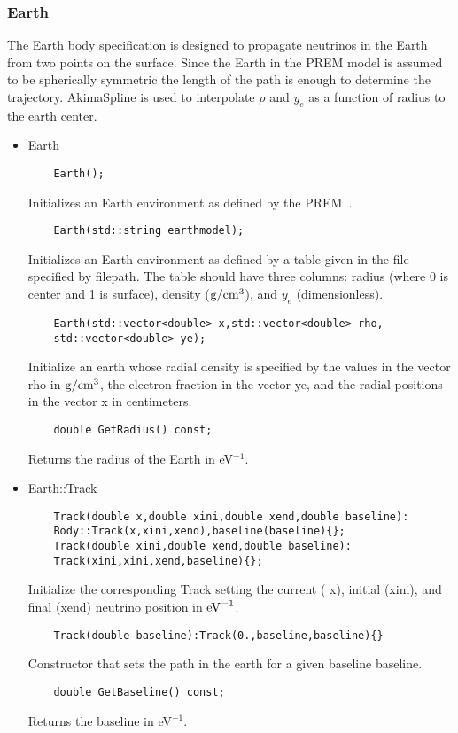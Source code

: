 \documentclass[3p,12pt]{elsarticle}
\newcommand{\ttf}{\ttfamily}
\begin{document}
\subsubsection{Earth \label{sec:earth}}
The {\ttf Earth} body specification is designed to propagate neutrinos
in the Earth from two points on the surface. Since the Earth in the
PREM model is assumed to be spherically symmetric the length of the
path is enough to determine the trajectory. {\ttfamily AkimaSpline} is used to interpolate $\rho$ and $y_e$ as a function of radius to the earth center.
\begin{itemize}
\item {\ttf Earth}
  \begin{lstlisting}
    Earth();
  \end{lstlisting}
  Initializes an {\ttf Earth} environment as defined by the PREM~\citep{dziewonski1981preliminary}.
  \begin{lstlisting}
    Earth(std::string earthmodel);
  \end{lstlisting}
  Initializes an {\ttf Earth} environment as defined by a table given in the file specified by {\ttf filepath}. The table should have three columns: radius (where 0 is center and 1 is surface), density (${\rm g}/{\rm cm}^3$), and $y_e$ (dimensionless). 
  \begin{lstlisting}
    Earth(std::vector<double> x,std::vector<double> rho,
    std::vector<double> ye);
  \end{lstlisting}
  Initialize an {\ttf earth} whose radial density is specified by the
  values in the vector {\ttf rho} in ${\rm g}/{\rm cm}^3$, the
  electron fraction in the vector {\ttf ye}, and the radial positions
  in the vector {\ttf x} in centimeters. 

  \begin{lstlisting}
    double GetRadius() const;
  \end{lstlisting}
  Returns the radius of the Earth in eV$^{-1}$.

\item {\ttf Earth::Track}
  \begin{lstlisting}
    Track(double x,double xini,double xend,double baseline):
    Body::Track(x,xini,xend),baseline(baseline){};
    Track(double xini,double xend,double baseline):
    Track(xini,xini,xend,baseline){};
  \end{lstlisting}
  Initialize the corresponding {\ttf Track} setting the current ({\ttf
    x}), initial ({\ttf xini}), and final ({\ttf xend}) neutrino position in ${\rm eV}^{-1}$.
  
  \begin{lstlisting}
    Track(double baseline):Track(0.,baseline,baseline){}
  \end{lstlisting}
  Constructor that sets the path in the earth for a given baseline
  {\ttf baseline}.

  \begin{lstlisting}
    double GetBaseline() const;
  \end{lstlisting}
  Returns the baseline in eV$^{-1}$.
    
\end{itemize}
\end{document}
